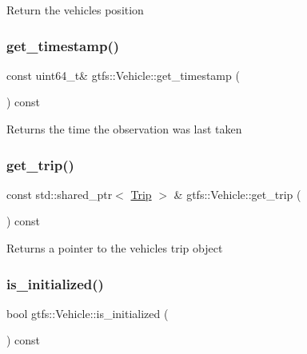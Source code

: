 Return the vehicle\textquotesingle{}s position \mbox{\label{classgtfs_1_1Vehicle_af064609446d9cde5b1a11e9a072eac4b}} 
\subsubsection{\texorpdfstring{get\+\_\+timestamp()}{get\_timestamp()}}
{\footnotesize\ttfamily const uint64\+\_\+t\& gtfs\+::\+Vehicle\+::get\+\_\+timestamp (\begin{DoxyParamCaption}{ }\end{DoxyParamCaption}) const\hspace{0.3cm}{\ttfamily [inline]}}

\begin{DoxyReturn}{Returns}
the time the observation was last taken 
\end{DoxyReturn}
\mbox{\label{classgtfs_1_1Vehicle_a616c83927f0d2d513d33277a9ebd3537}} 
\subsubsection{\texorpdfstring{get\+\_\+trip()}{get\_trip()}}
{\footnotesize\ttfamily const std\+::shared\+\_\+ptr$<$ \hyperlink{classgtfs_1_1Trip}{Trip} $>$ \& gtfs\+::\+Vehicle\+::get\+\_\+trip (\begin{DoxyParamCaption}{ }\end{DoxyParamCaption}) const}

\begin{DoxyReturn}{Returns}
a pointer to the vehicle\textquotesingle{}s trip object 
\end{DoxyReturn}
\mbox{\label{classgtfs_1_1Vehicle_ab956418d159120dd8b301d13d6fe6ec8}} 
\subsubsection{\texorpdfstring{is\+\_\+initialized()}{is\_initialized()}}
{\footnotesize\ttfamily bool gtfs\+::\+Vehicle\+::is\+\_\+initialized (\begin{DoxyParamCaption}{ }\end{DoxyParamCaption}) const\hspace{0.3cm}{\ttfamily [inline]}}

